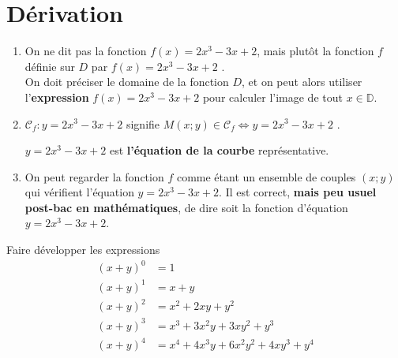 \documentclass[main.tex]{subfiles}
\begin{document}
 
\newpage 
{}  
\pagestyle{scrheadings} %
\onehalfspacing 
\setcounter{chapter}{3}
\chapter{Dérivation}  

\begin{remark} 
	\begin{enumerate}[label=\arabic*),leftmargin=*]
		\item On ne dit pas \og la fonction $f(x)=2x^3-3x+2$\fg, mais plutôt \og la fonction $f$ définie sur $D$ par $f(x)=2x^3-3x+2$ \fg. \\
		On doit préciser le domaine de la fonction $D$, et on peut alors utiliser l'\textbf{expression} $f(x)=2x^3-3x+2$ pour calculer l'image de tout $x\in\mathbb{D}$.
\item  \og $\mathscr{C}_f\colon y=2x^3-3x+2$ \fg  signifie \og $M(x;y)\in \mathscr{C}_f \iff y=2x^3-3x+2$ \fg.

$y=2x^3-3x+2$ est \textbf{l'équation de la courbe} représentative.
\item On peut regarder la fonction $f$ comme étant \og un ensemble de couples $(x;y)$ qui vérifient l'équation $y=2x^3-3x+2$\fg.  Il est correct, \textbf{mais peu usuel post-bac en mathématiques}, de dire \og soit  la fonction d'équation $y=2x^3-3x+2$\fg. 
	\end{enumerate} 
\end{remark}
\begin{example} Faire développer les expressions   
\begin{align*}
	(x+y)^0&= 1\\
	(x+y)^1&= x + y\\
	(x+y)^2&= x^2+ 2xy+ y^2\\
	(x+y)^3&= x^3+3x^2y+3xy^2+ y^3\\
	(x+y)^4&=x^4+4x^3y+6x^2y^2+4xy^3+y^4
\end{align*} 
\end{example} 

%	 
\newpage 
{}  
\pagestyle{scrheadings} %
\onehalfspacing
\end{document}
